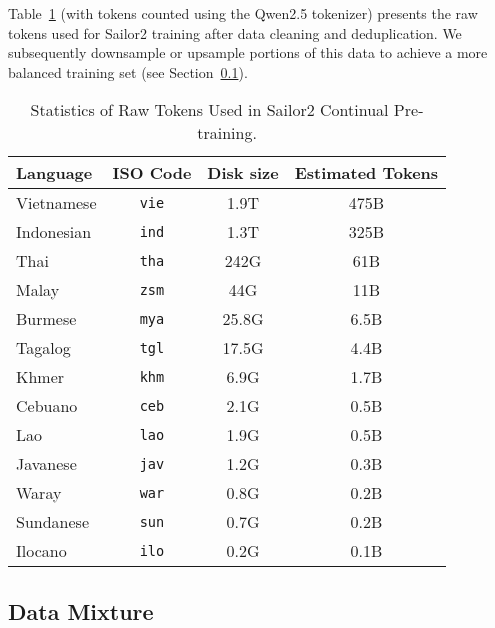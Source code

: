 Table~\ref{tab:disk_size_training_token} (with tokens counted using the Qwen2.5 tokenizer) presents the raw tokens used for Sailor2 training after data cleaning and deduplication. 
We subsequently downsample or upsample portions of this data to achieve a more balanced training set (see Section~\ref{sec:data_mixture}).

\begin{table}[ht]
\centering
\caption{Statistics of Raw Tokens Used in Sailor2 Continual Pre-training.}
\begin{tabular}{lccc}
\toprule
\textbf{Language} & \textbf{ISO Code} & \textbf{Disk size} & \textbf{Estimated Tokens} \\ \midrule
Vietnamese       & \texttt{vie}      & 1.9T               & 475B                    \\ 
Indonesian       & \texttt{ind}      & 1.3T               & 325B                    \\ 
Thai             & \texttt{tha}      & 242G               & 61B                     \\ 
Malay            & \texttt{zsm}      & 44G                & 11B                     \\ 
Burmese          & \texttt{mya}      & 25.8G              & 6.5B                    \\ 
Tagalog          & \texttt{tgl}      & 17.5G              & 4.4B                    \\ 
Khmer            & \texttt{khm}      & 6.9G               & 1.7B                    \\ 
Cebuano          & \texttt{ceb}     & 2.1G               & 0.5B                    \\ 
Lao              & \texttt{lao}      & 1.9G               & 0.5B                    \\ 
Javanese         & \texttt{jav}      & 1.2G               & 0.3B                    \\ 
Waray            & \texttt{war}     & 0.8G               & 0.2B                    \\ 
Sundanese        & \texttt{sun}      & 0.7G               & 0.2B                    \\ 
Ilocano          & \texttt{ilo}     & 0.2G               & 0.1B                    \\ \bottomrule
\end{tabular}
\label{tab:disk_size_training_token}
\end{table}


\subsection{Data Mixture}\label{sec:data_mixture}

